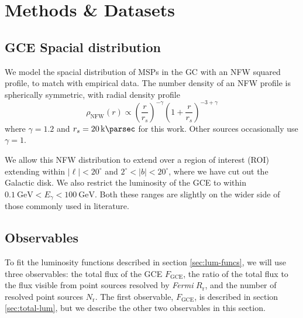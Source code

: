 \documentclass[a4paper,11pt]{article}
\newcommand{\parens}[1]{\left(#1\right)}
\begin{document}
\section{Methods \& Datasets}
\subsection{GCE Spacial distribution}
We model the spacial distribution of MSPs in the GC with an NFW squared profile, to match with empirical data. The number density of an NFW profile is spherically symmetric, with radial density profile
\label{sec:spacial-distro}
\begin{equation}
    \rho_\text{NFW}(r) \propto \parens{\frac{r}{r_s}}^{-\gamma}\parens{1 + \frac{r}{r_s}}^{-3+\gamma}
    \label{eqn:nfw}
\end{equation}
where $\gamma = 1.2$ and $r_s = \SI{20}{\kilo\parsec}$ for this work. Other sources occasionally use $\gamma = 1$.

We allow this NFW distribution to extend over a region of interest (ROI) extending within $|\ell| < 20^\circ$ and $2^\circ < |b| < 20^\circ$, where we have cut out the Galactic disk. We also restrict the luminosity of the GCE to within $\SI{0.1}{\giga\electronvolt} < E_\gamma < \SI{100}{\giga\electronvolt}$. Both these ranges are slightly on the wider side of those commonly used in literature.


\subsection{Observables}
\label{sec:observables}
To fit the luminosity functions described in section \ref{sec:lum-funcs}, we will use three observables: the total flux of the GCE $F_\text{GCE}$, the ratio of the total flux to the flux visible from point sources resolved by \textit{Fermi} $R_\text{r}$, and the number of resolved point sources $N_\text{r}$. The first observable, $F_\text{GCE}$, is described in section \ref{sec:total-lum}, but we describe the other two observables in this section.
\end{document}
